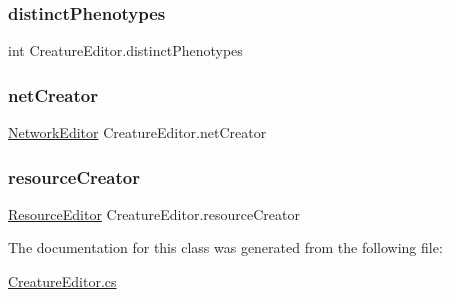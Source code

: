 \subsubsection{\texorpdfstring{distinct\+Phenotypes}{distinctPhenotypes}}
{\footnotesize\ttfamily int Creature\+Editor.\+distinct\+Phenotypes}

\mbox{\label{class_creature_editor_ae6f73bff56b148123b3ca5251bb00aee}} 
\subsubsection{\texorpdfstring{net\+Creator}{netCreator}}
{\footnotesize\ttfamily \mbox{\hyperlink{class_network_editor}{Network\+Editor}} Creature\+Editor.\+net\+Creator}

\mbox{\label{class_creature_editor_a61c343493865d7ead92c5ea83fdfe6f5}} 
\subsubsection{\texorpdfstring{resource\+Creator}{resourceCreator}}
{\footnotesize\ttfamily \mbox{\hyperlink{class_resource_editor}{Resource\+Editor}} Creature\+Editor.\+resource\+Creator}



The documentation for this class was generated from the following file\+:\begin{DoxyCompactItemize}
\item 
\mbox{\hyperlink{_creature_editor_8cs}{Creature\+Editor.\+cs}}\end{DoxyCompactItemize}
